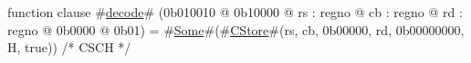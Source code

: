 function clause #\hyperref[zdecode]{decode}# (0b010010 @ 0b10000 @ rs : regno @ cb : regno @ rd : regno @ 0b0000 @ 0b01) = #\hyperref[zSome]{Some}#(#\hyperref[zCStore]{CStore}#(rs, cb, 0b00000, rd, 0b00000000, H, true)) /* CSCH */
